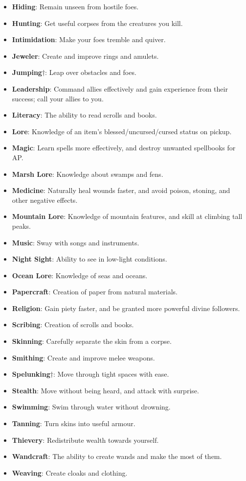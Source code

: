 \begin{itemize}
\item {\bf Hiding}: Remain unseen from hostile foes.
\item {\bf Hunting}: Get useful corpses from the creatures you kill. 
\item {\bf Intimidation}: Make your foes tremble and quiver. 
\item {\bf Jeweler}: Create and improve rings and amulets. 
\item {\bf Jumping}$\dagger$: Leap over obstacles and foes.
\item {\bf Leadership}: Command allies effectively and gain experience from their success; call your allies to you. 
\item {\bf Literacy}: The ability to read scrolls and books.
\item {\bf Lore}: Knowledge of an item's blessed/uncursed/cursed status on pickup.
\item {\bf Magic}: Learn spells more effectively, and destroy unwanted spellbooks for AP.
\item {\bf Marsh Lore}: Knowledge about swamps and fens. 
\item {\bf Medicine}: Naturally heal wounds faster, and avoid poison, stoning, and other negative effects.
\item {\bf Mountain Lore}: Knowledge of mountain features, and skill at climbing tall peaks.
\item {\bf Music}: Sway with songs and instruments. 
\item {\bf Night Sight}: Ability to see in low-light conditions. 
\item {\bf Ocean Lore}: Knowledge of seas and oceans. 
\item {\bf Papercraft}: Creation of paper from natural materials. 
\item {\bf Religion}: Gain piety faster, and be granted more powerful divine followers. 
\item {\bf Scribing}: Creation of scrolls and books. 
\item {\bf Skinning}: Carefully separate the skin from a corpse. 
\item {\bf Smithing}: Create and improve melee weapons.
\item {\bf Spelunking}$\dagger$: Move through tight spaces with ease.
\item {\bf Stealth}: Move without being heard, and attack with surprise.
\item {\bf Swimming}: Swim through water without drowning.
\item {\bf Tanning}: Turn skins into useful armour.
\item {\bf Thievery}: Redistribute wealth towards yourself.
\item {\bf Wandcraft}: The ability to create wands and make the most of them.
\item {\bf Weaving}: Create cloaks and clothing.
\end{itemize}

